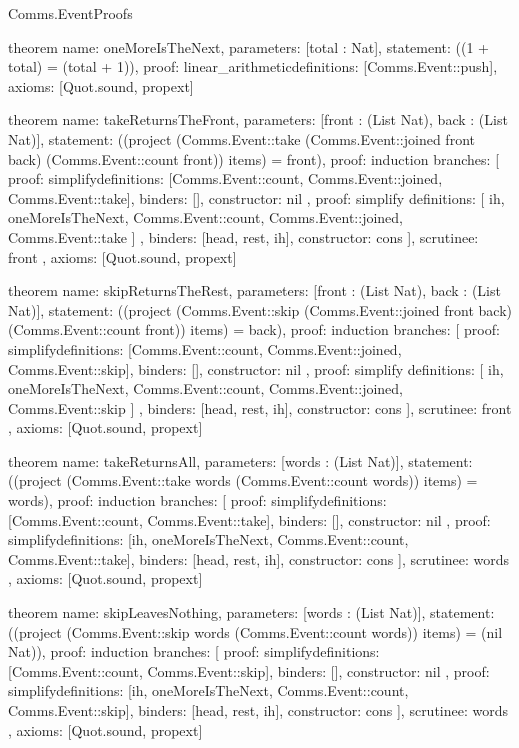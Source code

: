 \begin{lexlean}{Comms.EventProofs}
\begin{semanticmodule}
theorem{
  name: oneMoreIsTheNext,
  parameters: [total : Nat],
  statement: ((1 + total) = (total + 1)),
  proof: linear_arithmetic{definitions: [Comms.Event::push]},
  axioms: [Quot.sound, propext]
}

theorem{
  name: takeReturnsTheFront,
  parameters: [front : (List Nat), back : (List Nat)],
  statement: ((project (Comms.Event::take (Comms.Event::joined front back) (Comms.Event::count front)) items) = front),
  proof: induction{
    branches: [
      {
        proof: simplify{definitions: [Comms.Event::count, Comms.Event::joined, Comms.Event::take]},
        binders: [],
        constructor: nil
      },
      {
        proof: simplify{
          definitions: [
            ih,
            oneMoreIsTheNext,
            Comms.Event::count,
            Comms.Event::joined,
            Comms.Event::take
          ]
        },
        binders: [head, rest, ih],
        constructor: cons
      }
    ],
    scrutinee: front
  },
  axioms: [Quot.sound, propext]
}

theorem{
  name: skipReturnsTheRest,
  parameters: [front : (List Nat), back : (List Nat)],
  statement: ((project (Comms.Event::skip (Comms.Event::joined front back) (Comms.Event::count front)) items) = back),
  proof: induction{
    branches: [
      {
        proof: simplify{definitions: [Comms.Event::count, Comms.Event::joined, Comms.Event::skip]},
        binders: [],
        constructor: nil
      },
      {
        proof: simplify{
          definitions: [
            ih,
            oneMoreIsTheNext,
            Comms.Event::count,
            Comms.Event::joined,
            Comms.Event::skip
          ]
        },
        binders: [head, rest, ih],
        constructor: cons
      }
    ],
    scrutinee: front
  },
  axioms: [Quot.sound, propext]
}

theorem{
  name: takeReturnsAll,
  parameters: [words : (List Nat)],
  statement: ((project (Comms.Event::take words (Comms.Event::count words)) items) = words),
  proof: induction{
    branches: [
      {
        proof: simplify{definitions: [Comms.Event::count, Comms.Event::take]},
        binders: [],
        constructor: nil
      },
      {
        proof: simplify{definitions: [ih, oneMoreIsTheNext, Comms.Event::count, Comms.Event::take]},
        binders: [head, rest, ih],
        constructor: cons
      }
    ],
    scrutinee: words
  },
  axioms: [Quot.sound, propext]
}

theorem{
  name: skipLeavesNothing,
  parameters: [words : (List Nat)],
  statement: ((project (Comms.Event::skip words (Comms.Event::count words)) items) = (nil Nat)),
  proof: induction{
    branches: [
      {
        proof: simplify{definitions: [Comms.Event::count, Comms.Event::skip]},
        binders: [],
        constructor: nil
      },
      {
        proof: simplify{definitions: [ih, oneMoreIsTheNext, Comms.Event::count, Comms.Event::skip]},
        binders: [head, rest, ih],
        constructor: cons
      }
    ],
    scrutinee: words
  },
  axioms: [Quot.sound, propext]
}


\end{semanticmodule}
\end{lexlean}
